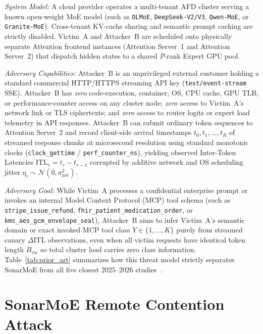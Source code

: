 \documentclass[final,5p,times,twocolumn]{elsarticle}
\def\SM{SonarMoE}%
\theoremstyle{definition}
\theoremstyle{remark}
\newcommand{\SM}{\textsc{SonarMoE}}
\begin{document}
\emph{System Model:} A cloud provider operates a multi-tenant AFD cluster serving a known open-weight MoE model (such as \texttt{OLMoE}, \texttt{DeepSeek-V2/V3}, \texttt{Qwen-MoE}, or \texttt{Granite-MoE}). Cross-tenant KV-cache sharing and semantic prompt caching are strictly disabled. Victim~A and Attacker~B are scheduled onto physically separate Attention frontend instances (Attention Server~1 and Attention Server~2) that dispatch hidden states to a shared $P$-rank Expert GPU pool.

\emph{Adversary Capabilities:} Attacker~B is an unprivileged external customer holding a standard commercial HTTP/HTTPS streaming API key (\texttt{text/event-stream} SSE). Attacker~B has \emph{zero} code-execution, container, OS, CPU cache, GPU TLB, or performance-counter access on any cluster node; \emph{zero} access to Victim~A's network link or TLS ciphertexts; and \emph{zero} access to router logits or expert load telemetry in API responses. Attacker~B can submit ordinary token sequences to Attention Server~2 and record client-side arrival timestamps $t_0, t_1, \dots, t_R$ of streamed response chunks at microsecond resolution using standard monotonic clocks (\texttt{clock\_gettime} / \texttt{perf\_counter\_ns}), yielding observed Inter-Token Latencies $\mathrm{ITL}_r = t_r - t_{r-1}$ corrupted by additive network and OS scheduling jitter $\eta_r \sim \mathcal{N}(0, \sigma_{\mathrm{net}}^2)$.

\emph{Adversary Goal:} While Victim~A processes a confidential enterprise prompt or invokes an internal Model Context Protocol (MCP) tool schema (such as \texttt{stripe\_issue\_refund}, \texttt{fhir\_patient\_medication\_order}, or \texttt{kms\_aes\_gcm\_envelope\_seal}), Attacker~B aims to infer Victim~A's semantic domain or exact invoked MCP tool class $Y \in \{1, \dots, K\}$ purely from streamed canary $\Delta\mathrm{ITL}$ observations, even when all victim requests have identical token length $B_{\mathrm{vic}}$ so total cluster load carries zero class information. Table~\ref{tab:prior_art} summarizes how this threat model strictly separates \SM{} from all five closest $2025$--$2026$ studies~\cite{wu2025promptpeek,zheng2025inputsnatch,microsoft2025whisperleak,ding2025moecho,patel2026routingmembership,liu2026straggler}.

\section{SonarMoE Remote Contention Attack}\label{sec:attack}
\end{document}
